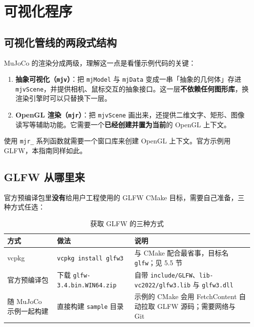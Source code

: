 \section{可视化程序}

\subsection{可视化管线的两段式结构}

MuJoCo 的渲染分成两级，理解这一点是看懂示例代码的关键：

\begin{enumerate}
	\item \textbf{抽象可视化（\texttt{mjv}）}：把 \texttt{mjModel} 与 \texttt{mjData} 变成一串「抽象的几何体」存进 \texttt{mjvScene}，并提供相机、鼠标交互的抽象接口。这一层\textbf{不依赖任何图形库}，换渲染引擎时可以只替换下一层。
	\item \textbf{OpenGL 渲染（\texttt{mjr}）}：把 \texttt{mjvScene} 画出来，还提供二维文字、矩形、图像读写等辅助功能。它需要一个\textbf{已经创建并置为当前}的 OpenGL 上下文。
\end{enumerate}

使用 \texttt{mjr\_} 系列函数就需要一个窗口库来创建 OpenGL 上下文。官方示例用 GLFW，本指南同样如此。

\subsection{GLFW 从哪里来}

官方预编译包里\textbf{没有}给用户工程使用的 GLFW CMake 目标，需要自己准备，三种方式任选：

\begin{table}[H]
	\centering
	\caption{获取 GLFW 的三种方式}
	\label{tab:Cpp:GLFW}
	\footnotesize
	\begin{tabular}{>{\raggedright\arraybackslash}p{3.2cm}>{\raggedright\arraybackslash}p{5.4cm}>{\raggedright\arraybackslash}p{5.6cm}}
		\hline
		方式 & 做法 & 说明 \\
		\hline
		vcpkg & \texttt{vcpkg install glfw3} & 与 CMake 配合最省事，目标名 \texttt{glfw}；见 5.5 节 \\
		官方预编译包 & 下载 \texttt{glfw-3.4.bin.WIN64.zip} & 自带 \texttt{include/GLFW}、\texttt{lib-vc2022/glfw3.lib} 与 \texttt{glfw3.dll} \\
		随 MuJoCo 示例一起构建 & 直接构建 \texttt{sample} 目录 & 示例的 CMake 会用 FetchContent 自动拉取 GLFW 源码；需要网络与 Git \\
		\hline
	\end{tabular}
\end{table}

